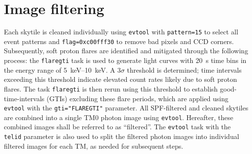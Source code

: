 \section{Image filtering}
Each skytile is cleaned individually using \texttt{evtool} with \texttt{pattern=15} to select all event patterns and \texttt{flag=0xc00fff30} to remove bad pixels and CCD corners. Subsequently, soft proton flares are identified and mitigated through the following process: the \texttt{flaregti} task is used to generate light curves with \SI{20}{\second} time bins in the energy range of \SIrange{5}{10}{\kilo\electronvolt}. A \(3\sigma\) threshold is determined; time intervals exceeding this threshold indicate elevated count rates likely due to soft proton flares. The task \texttt{flaregti} is then rerun using this threshold to establish good-time-intervals (GTIs) excluding these flare periods, which are applied using \texttt{evtool} with the \texttt{gti="FLAREGTI"} parameter. All SPF-filtered and cleaned skytiles are combined into a single TM0 photon image using \texttt{evtool}. Hereafter, these combined images shall be referred to as \enquote{filtered}. The \texttt{evtool} task with the \texttt{telid} parameter is also used to split the filtered photon images into individual filtered images for each TM, as needed for subsequent steps.
%
